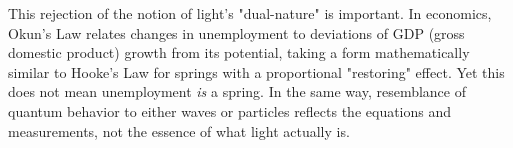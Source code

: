 This rejection of the notion of light's "dual-nature" is important. In economics, Okun's Law relates changes in unemployment to deviations of GDP (gross domestic product) growth from its potential, taking a form mathematically similar to Hooke's Law for springs with a proportional "restoring" effect. Yet this does not mean unemployment \textit{is} a spring. In the same way, resemblance of quantum behavior to either waves or particles reflects the equations and measurements, not the essence of what light actually is.